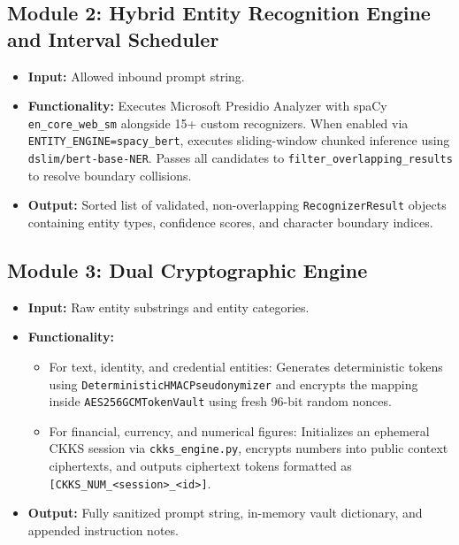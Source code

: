 \documentclass[12pt,a4paper,oneside]{report}
\numberwithin{equation}{chapter}
\begin{document}
\subsection{Module 2: Hybrid Entity Recognition Engine and Interval Scheduler}
\begin{itemize}[leftmargin=*]
    \item \textbf{Input:} Allowed inbound prompt string.
    \item \textbf{Functionality:} Executes Microsoft Presidio Analyzer with spaCy \texttt{en\_core\_web\_sm} alongside 15+ custom recognizers. When enabled via \texttt{ENTITY\_ENGINE=spacy\_bert}, executes sliding-window chunked inference using \texttt{dslim/bert-base-NER}. Passes all candidates to \texttt{filter\_overlapping\_results} to resolve boundary collisions.
    \item \textbf{Output:} Sorted list of validated, non-overlapping \texttt{RecognizerResult} objects containing entity types, confidence scores, and character boundary indices.
\end{itemize}

\subsection{Module 3: Dual Cryptographic Engine}
\begin{itemize}[leftmargin=*]
    \item \textbf{Input:} Raw entity substrings and entity categories.
    \item \textbf{Functionality:} 
    \begin{itemize}
        \item For text, identity, and credential entities: Generates deterministic tokens using \texttt{DeterministicHMACPseudonymizer} and encrypts the mapping inside \texttt{AES256GCMTokenVault} using fresh 96-bit random nonces.
        \item For financial, currency, and numerical figures: Initializes an ephemeral CKKS session via \texttt{ckks\_engine.py}, encrypts numbers into public context ciphertexts, and outputs ciphertext tokens formatted as \texttt{[CKKS\_NUM\_<session>\_<id>]}.
    \end{itemize}
    \item \textbf{Output:} Fully sanitized prompt string, in-memory vault dictionary, and appended instruction notes.
\end{itemize}
\end{document}
